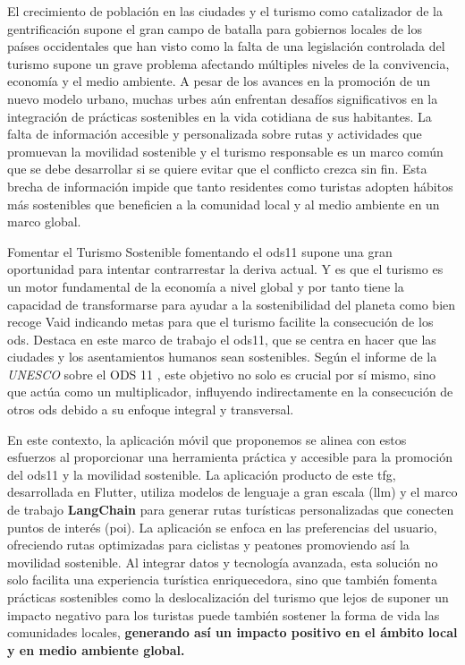 
El crecimiento de población en las ciudades \cite{nieuwenhuijsen_urban_2020} y el turismo como catalizador de la gentrificación supone el gran campo de batalla para gobiernos locales de los países occidentales que han visto como la falta de una legislación controlada del turismo supone un grave problema afectando múltiples niveles de la convivencia, economía y el medio ambiente. A pesar de los avances en la promoción de un nuevo modelo urbano, muchas urbes aún enfrentan desafíos significativos en la integración de prácticas sostenibles en la vida cotidiana de sus habitantes. La falta de información accesible y personalizada sobre rutas y actividades que promuevan la movilidad sostenible y el turismo responsable es un marco común que se debe desarrollar si se quiere evitar que el conflicto crezca sin fin. Esta brecha de información impide que tanto residentes como turistas adopten hábitos más sostenibles que beneficien a la comunidad local y al medio ambiente en un marco global.

Fomentar el Turismo Sostenible fomentando el \acrfull{ods11} supone una gran oportunidad para intentar contrarrestar la deriva actual. Y es que el turismo es un motor fundamental de la economía a nivel global y por tanto tiene la capacidad de transformarse para ayudar a la sostenibilidad del planeta como bien recoge Vaid \cite{vaid_sustainable_2024-1} indicando metas para que el turismo facilite la consecución de los \acrfull{ods}. Destaca en este marco de trabajo el \acrshort{ods11}, que se centra en hacer que las ciudades y los asentamientos humanos sean sostenibles. Según el informe de la \textit{UNESCO} sobre el ODS 11 \cite{ionescu_progress_2024}, este objetivo no solo es crucial por sí mismo, sino que actúa como un multiplicador, influyendo indirectamente en la consecución de otros \acrshort{ods} debido a su enfoque integral y transversal.

En este contexto, la aplicación móvil que proponemos se alinea con estos esfuerzos al proporcionar una herramienta práctica y accesible para la promoción del \acrfull{ods11} y la movilidad sostenible. La aplicación producto de este \acrshort{tfg}, desarrollada en Flutter, utiliza modelos de lenguaje a gran escala (\acrfull{llm}) y el marco de trabajo \textbf{LangChain} para generar rutas turísticas personalizadas que conecten puntos de interés (\acrfull{poi}). La aplicación se enfoca en las preferencias del usuario, ofreciendo rutas optimizadas para ciclistas y peatones promoviendo así la movilidad sostenible. Al integrar datos y tecnología avanzada, esta solución no solo facilita una experiencia turística enriquecedora, sino que también fomenta prácticas sostenibles como la deslocalización del turismo que lejos de suponer un impacto negativo para los turistas \cite{mitas_tell_2023} puede también sostener la forma de vida las comunidades locales, \textbf{generando así un impacto positivo en el ámbito local y en medio ambiente global.}
